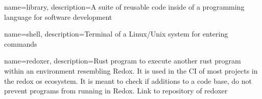 {
	name={library},
	description={A suite of reusable code inside of a programming language for software development}
}


{
	name={shell},
	description={Terminal of a Linux/Unix system for entering commands}
}

{
	name={redoxer},
	description={Rust program to execute another rust program within an environment resembling Redox.
			It is used in the CI of most projects in the redox os ecosystem.
			It is meant to check if additions to a code base, do not prevent programs from running in Redox.
			Link to repository of redoxer \cite{link_repos_redoxer}}
}
\glsaddall
